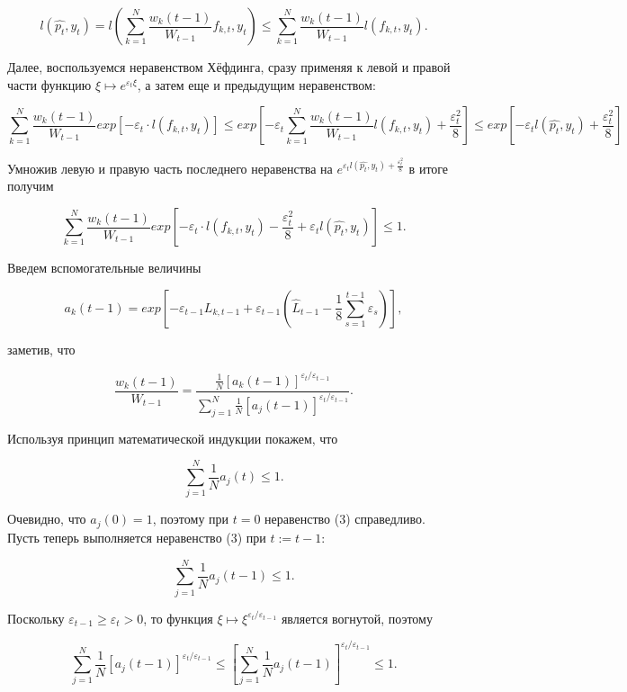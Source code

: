 \documentclass{article}
\begin{document}
\[ 
l(\hat{p_t}, y_t) = l(\sum^N_{k=1} \frac{w_k(t-1)}{W_{t-1}} f_{k,t}, y_t) \le \sum^N_{k=1} \frac{w_k(t-1)}{W_{t-1}} l(f_{k,t}, y_t). 
\]

Далее, воспользуемся неравенством Хёфдинга, сразу применяя к левой и правой части функцию $\xi \mapsto e^{\varepsilon_t \xi}$, а затем еще и предыдущим неравенством:

\[ 
\sum^N_{k=1} \frac{w_k(t-1)}{W_{t-1}} exp[-\varepsilon_t \cdot l(f_{k,t}, y_t)] \le 
exp[ - \varepsilon_t \sum^N_{k=1} \frac{w_k(t-1)}{W_{t-1}} l(f_{k,t}, y_t) + \frac{\varepsilon^2_t}{8} ] \le
exp[-\varepsilon_t l(\hat{p_t}, y_t) + \frac{\varepsilon^2_t}{8}]
\]

Умножив левую и правую часть последнего неравенства на $ e^{\varepsilon_t l(\hat{p_t}, y_t) + \frac{\varepsilon^2_t}{8}}$ в итоге получим

\begin{equation}
\sum^N_{k=1} \frac{w_k(t-1)}{W_{t-1}} exp[-\varepsilon_t \cdot l(f_{k,t}, y_t) - \frac{\varepsilon^2_t}{8} + \varepsilon_t l(\hat{p_t}, y_t) ] \le 1.
\end{equation}

Введем вспомогательные величины

\[  
a_k(t-1) = exp[ -\varepsilon_{t-1} L_{k,t-1} + \varepsilon_{t-1} (\hat{L}_{t-1} - \frac{1}{8} \sum^{t-1}_{s=1} \varepsilon_s)],
\]

заметив, что 

\begin{equation}
\frac{w_k(t-1)}{W_{t-1}} = \frac{ \frac{1}{N} [a_k(t-1)]^{\varepsilon_t / \varepsilon_{t-1}} }{ \sum^N_{j=1} \frac{1}{N} [a_j(t - 1)]^{\varepsilon_t / \varepsilon_{t-1}} }.
\end{equation}

Используя принцип математической индукции покажем, что

\begin{equation}
\sum^N_{j=1} \frac{1}{N} a_j(t) \le 1.
\end{equation}

Очевидно, что $a_j (0) = 1$, поэтому при $t = 0$ неравенство (3) справедливо. Пусть теперь выполняется неравенство (3) при $t := t - 1$:

\[ 
\sum^N_{j=1} \frac{1}{N} a_j(t-1) \le 1.
\]

Поскольку $\varepsilon_{t-1} \ge \varepsilon_t > 0$, то функция $\xi \mapsto \xi^{\varepsilon_t / \varepsilon_{t-1}}$ является вогнутой, поэтому 

\[ 
\sum^N_{j=1} \frac{1}{N} [a_j(t-1)]^{\varepsilon_t / \varepsilon_{t-1}} \le [\sum^N_{j=1} \frac{1}{N} a_j(t-1)]^{\varepsilon_t / \varepsilon_{t-1}} \le 1.
\]
\end{document}
